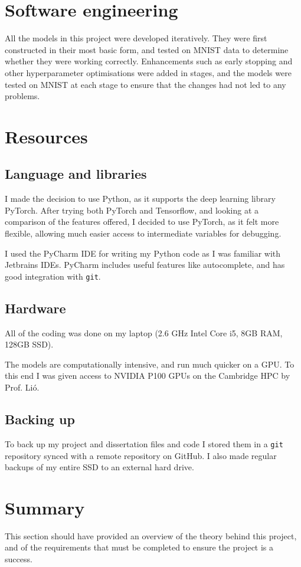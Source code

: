 \section{Software engineering}

All the models in this project were developed iteratively. They were first constructed in their most basic form, and tested on MNIST 
data to determine whether they were working correctly. Enhancements such as early stopping and other hyperparameter optimisations were 
added in stages, and the models were tested on MNIST at each stage to ensure that the changes had not led to any problems.

\section{Resources}

\subsection{Language and libraries}
I made the decision to use Python, as it supports the deep learning library PyTorch.  After trying both PyTorch and Tensorflow, 
and looking at a comparison of the features offered, I decided to 
use PyTorch, as it felt more flexible, allowing much easier access 
to intermediate variables for debugging.

I used the PyCharm IDE for writing my Python code as I was familiar with Jetbrains IDEs.
PyCharm includes useful features like autocomplete, and has good integration with \texttt{git}.

\subsection{Hardware}
All of the coding was done on my laptop (2.6 GHz Intel Core i5, 8GB RAM, 128GB SSD).

The models are computationally intensive, and run much 
quicker on a GPU. To this end I was given access to NVIDIA P100 GPUs on the Cambridge HPC by Prof. Li\'o.

\subsection{Backing up}
To back up my project and dissertation files and code I stored them in a \texttt{git} repository synced with a remote repository on GitHub. I also 
made regular backups of my entire SSD to an external hard drive.

\section{Summary}
This section should have provided an overview of the theory behind this project, and of the requirements that must be completed to 
ensure the project is a success.